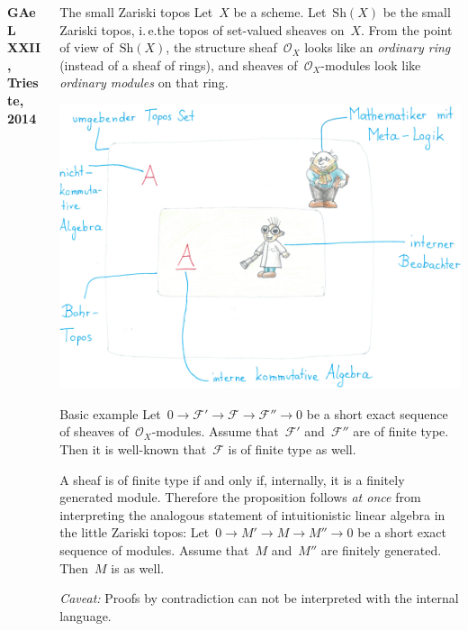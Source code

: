 \documentclass[table]{beamer}
\newcommand{\F}{\mathcal{F}}
\renewcommand{\O}{\mathcal{O}}
\newcommand{\Sh}{\mathrm{Sh}}
\begin{document}
\begin{frame}[t]
\begin{columns}[t]
\begin{column}{0.3\textwidth}
  \vspace{3cm}
  \textbf{GAeL XXII, Trieste, 2014}
\end{column}

\begin{column}{0.3\textwidth}
  \begin{block}{The small Zariski topos}
    Let~$X$ be a scheme. Let~$\Sh(X)$ be the small Zariski topos, i.\,e.\@ the
    topos of set-valued sheaves on~$X$. From the point of view of~$\Sh(X)$,
    the structure sheaf~$\O_X$ looks like an \emph{ordinary ring} (instead of a
    sheaf of rings), and sheaves of~$\O_X$-modules look like \emph{ordinary
    modules} on that ring.\bigskip

    \includegraphics[width=\columnwidth]{bohr-topos}
  \end{block}
  \bigskip

  \begin{block}{Basic example}
    Let~$0 \to \F' \to \F \to \F'' \to 0$ be a short exact sequence of sheaves
    of~$\O_X$-modules. Assume that~$\F'$ and~$\F''$ are of finite type. Then it is
    well-known that~$\F$ is of finite type as well.\medskip

    A sheaf is of finite type if and only if, internally, it is a
    finitely generated module. Therefore the proposition follows \emph{at once}
    from interpreting the analogous statement of intuitionistic linear algebra
    in the little Zariski topos:
    Let~$0 \to M' \to M \to M'' \to 0$ be a short exact sequence of modules.
    Assume that~$M$ and~$M''$ are finitely generated. Then~$M$ is as well.
    \medskip

    \emph{Caveat:} Proofs by contradiction can not be interpreted with the
    internal language.
  \end{block}
\end{column}


\end{columns}
\end{frame}
\end{document}
